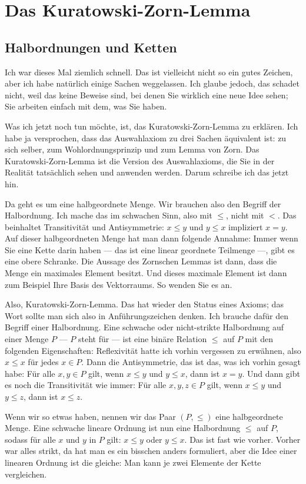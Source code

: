 \section{Das Kuratowski-Zorn-Lemma}

\subsection{Halbordnungen und Ketten}

\begin{spoken-clean}[00:54:40 - 00:56:40]
Ich war dieses Mal ziemlich schnell. Das ist vielleicht nicht so ein gutes Zeichen, aber ich habe natürlich einige Sachen weggelassen. Ich glaube jedoch, das schadet nicht, weil das keine Beweise sind, bei denen Sie wirklich eine neue Idee sehen; Sie arbeiten einfach mit dem, was Sie haben. 

Was ich jetzt noch tun möchte, ist, das Kuratowski-Zorn-Lemma zu erklären. Ich habe ja versprochen, dass das Auswahlaxiom zu drei Sachen äquivalent ist: zu sich selber, zum Wohlordnungsprinzip und zum Lemma von Zorn. Das Kuratowski-Zorn-Lemma ist die Version des Auswahlaxioms, die Sie in der Realität tatsächlich sehen und anwenden werden. Darum schreibe ich das jetzt hin.

Da geht es um eine halbgeordnete Menge. Wir brauchen also den Begriff der Halbordnung. Ich mache das im schwachen Sinn, also mit $\le$, nicht mit $<$. Das beinhaltet Transitivität und Antisymmetrie: $x \le y$ und $y \le x$ impliziert $x = y$. Auf dieser halbgeordneten Menge hat man dann folgende Annahme: Immer wenn Sie eine Kette darin haben --- das ist eine linear geordnete Teilmenge ---, gibt es eine obere Schranke. Die Aussage des Zornschen Lemmas ist dann, dass die Menge ein maximales Element besitzt. Und dieses maximale Element ist dann zum Beispiel Ihre Basis des Vektorraums. So wenden Sie es an.
\end{spoken-clean}

\begin{spoken-clean}[00:56:40 - 00:58:40]
Also, Kuratowski-Zorn-Lemma. Das hat wieder den Status eines Axioms; das Wort  sollte man sich also in Anführungszeichen denken. Ich brauche dafür den Begriff einer Halbordnung. Eine schwache oder nicht-strikte Halbordnung auf einer Menge $P$ --- $P$ steht für  --- ist eine binäre Relation $\le$ auf $P$ mit den folgenden Eigenschaften: Reflexivität hatte ich vorhin vergessen zu erwähnen, also $x \le x$ für jedes $x \in P$. Dann die Antisymmetrie, das ist das, was ich vorhin gesagt habe: Für alle $x, y \in P$ gilt, wenn $x \le y$ und $y \le x$, dann ist $x = y$. Und dann gibt es noch die Transitivität wie immer: Für alle $x, y, z \in P$ gilt, wenn $x \le y$ und $y \le z$, dann ist $x \le z$.

Wenn wir so etwas haben, nennen wir das Paar $(P, \le)$ eine halbgeordnete Menge. Eine schwache lineare Ordnung ist nun eine Halbordnung $\le$ auf $P$, sodass für alle $x$ und $y$ in $P$ gilt: $x \le y$ oder $y \le x$. Das ist fast wie vorher. Vorher war alles strikt, da hat man es ein bisschen anders formuliert, aber die Idee einer linearen Ordnung ist die gleiche: Man kann je zwei Elemente der Kette vergleichen.
\end{spoken-clean}

